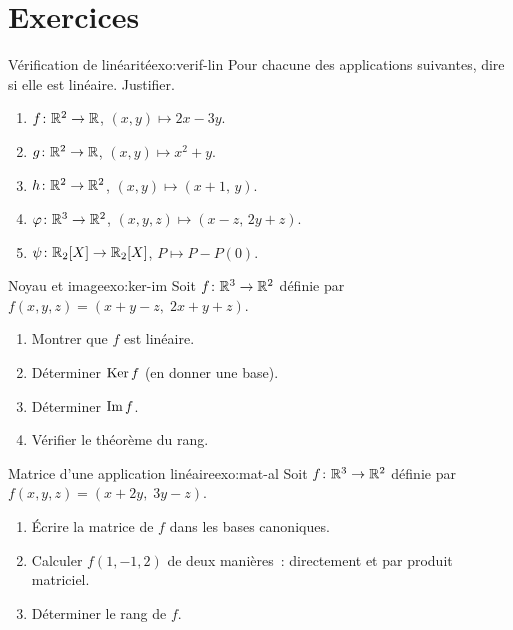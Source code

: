 \section{Exercices}\label{sec:exo-ch2}

\begin{exercise}{\basic{} Vérification de linéarité}{exo:verif-lin}
  Pour chacune des applications suivantes, dire si elle est linéaire.
  Justifier.
  \begin{enumerate}[label=(\alph*)]
    \item $f\colon{\mathbb{R}}^2\to{\mathbb{R}}$, $(x,y)\mapsto 2x-3y$.
    \item $g\colon{\mathbb{R}}^2\to{\mathbb{R}}$, $(x,y)\mapsto x^2+y$.
    \item $h\colon{\mathbb{R}}^2\to{\mathbb{R}}^2$, $(x,y)\mapsto(x+1,\,y)$.
    \item $\varphi\colon{\mathbb{R}}^3\to{\mathbb{R}}^2$, $(x,y,z)\mapsto(x-z,\,2y+z)$.
    \item $\psi\colon{\mathbb{R}}_2[X]\to{\mathbb{R}}_2[X]$, $P\mapsto P-P(0)$.
  \end{enumerate}
\end{exercise}

\begin{exercise}{\basic{} Noyau et image}{exo:ker-im}
  Soit $f\colon{\mathbb{R}}^3\to{\mathbb{R}}^2$ définie par
  $f(x,y,z)=(x+y-z,\;2x+y+z)$.
  \begin{enumerate}[label=(\alph*)]
    \item Montrer que $f$ est linéaire.
    \item Déterminer $\operatorname{Ker} f$ (en donner une base).
    \item Déterminer $\operatorname{Im} f$.
    \item Vérifier le théorème du rang.
  \end{enumerate}
\end{exercise}

\begin{exercise}{\basic{} Matrice d'une application linéaire}{exo:mat-al}
  Soit $f\colon{\mathbb{R}}^3\to{\mathbb{R}}^2$ définie par $f(x,y,z)=(x+2y,\;3y-z)$.
  \begin{enumerate}[label=(\alph*)]
    \item Écrire la matrice de $f$ dans les bases canoniques.
    \item Calculer $f(1,-1,2)$ de deux manières~: directement et par
      produit matriciel.
    \item Déterminer le rang de $f$.
  \end{enumerate}
\end{exercise}

